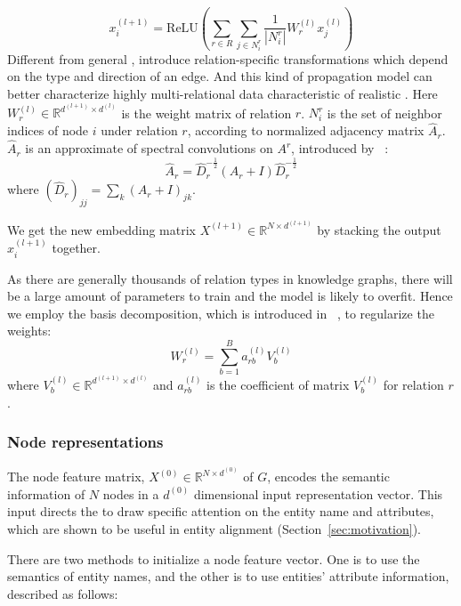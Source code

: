 	\begin{equation}
	x_i^{(l+1)}=\mathrm{ReLU} (\sum\limits_{r \in R}\sum\limits_{j \in N_i^r}\frac{1}{|N_i^r|}W_r^{(l)}x_j^{(l)})
	\end{equation}
	Different from general \GCNs, \RGCNs introduce relation-specific transformations which depend on the type and direction of an edge. And this kind of propagation model can better characterize highly multi-relational data characteristic of realistic \KGs. Here $W_r^{(l)} \in \mathbb{R}^{d^{(l+1)} \times d^{(l)}}$ is the weight matrix of relation $r$. $N_i^r$ is the set of neighbor indices of node $i$ under relation $r$, according to normalized adjacency matrix $\hat A_r$. $\hat A_r$ is an approximate of spectral convolutions on $A^r$, introduced by ~\cite{Kipf2016Semi}:
	\begin{equation}
	\hat A_r=\hat D_r^{- \frac{1}{2}}(A_r+I)\hat D_r^{- \frac{1}{2}}
	\end{equation}
	where $(\hat D_r)_{jj}=\sum_k(A_r+I)_{jk}$.
	
	We get the new embedding matrix $X^{(l+1)} \in \mathbb{R}^{N \times d^{(l+1)}}$ by stacking the output $x_i^{(l+1)}$ together.
	
	As there are generally thousands of relation types in knowledge graphs, there will be a large amount of parameters to train and the model is likely to overfit. Hence we employ the basis decomposition, which is introduced in ~\cite{Schlichtkrull2017Modeling}, to regularize the weights:
	\begin{equation}
	W_r^{(l)}=\sum\limits_{b=1}^B a_{rb}^{(l)}V_b^{(l)}
	\end{equation}
	where $V_b^{(l)} \in \mathbb{R}^{d^{(l+1)} \times d^{(l)}}$ and $a_{rb}^{(l)}$ is the coefficient of matrix $V_b^{(l)}$ for relation $r$.
	

	\subsubsection{Node representations}
	\label{subsection:Node Representations}
   The node feature matrix, $X^{(0)} \in \mathbb{R}^{N \times d^{(0)}}$ of $G$, encodes the semantic information of $N$  nodes in a $d^{(0)}$ dimensional input representation vector.
   This input directs the \RGCN to draw specific attention on the entity name and attributes, which are shown to be useful in entity
   alignment (Section~\ref{sec:motivation}).


	There are two methods to initialize a node feature vector.
	One is to use the semantics of entity names, and the other is to use entities' attribute information, described as follows:
	
